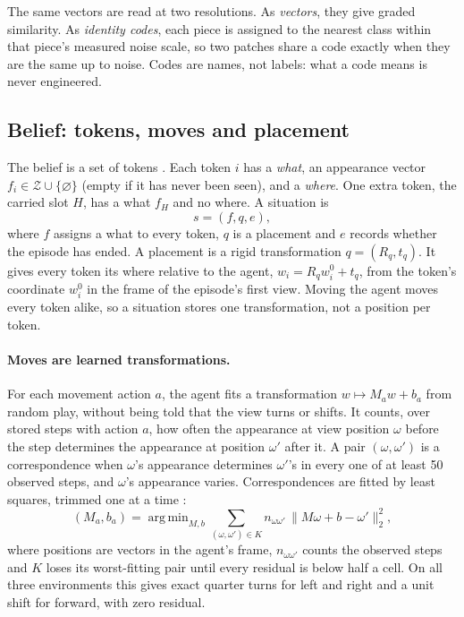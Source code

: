 \documentclass{article}
\DeclareMathOperator*{\argmin}{arg\,min}
\begin{document}
The same vectors are read at two resolutions. As \emph{vectors}, they give graded similarity. As \emph{identity codes}, each piece is assigned to the nearest class within that piece's measured noise scale, so two patches share a code exactly when they are the same up to noise. Codes are names, not labels: what a code means is never engineered.

\subsection{Belief: tokens, moves and placement}
\label{sec:belief}

The belief is a set of tokens \cite{Dosovitskiy2021,Locatello2020}. Each token $i$ has a \emph{what}, an appearance vector $f_i\in\mathcal{Z}\cup\{\varnothing\}$ (empty if it has never been seen), and a \emph{where}. One extra token, the carried slot $H$, has a what $f_H$ and no where. A situation is
\begin{equation} \label{eq:situation}
    s = (f, q, e),
\end{equation}
where $f$ assigns a what to every token, $q$ is a placement and $e$ records whether the episode has ended. A placement is a rigid transformation $q=(R_q, t_q)$. It gives every token its where relative to the agent, $w_i = R_q w_i^0 + t_q$, from the token's coordinate $w^0_i$ in the frame of the episode's first view. Moving the agent moves every token alike, so a situation stores one transformation, not a position per token.

\paragraph{Moves are learned transformations.} For each movement action $a$, the agent fits a transformation $w\mapsto M_a w+b_a$ from random play, without being told that the view turns or shifts. It counts, over stored steps with action $a$, how often the appearance at view position $\omega$ before the step determines the appearance at position $\omega'$ after it. A pair $(\omega,\omega')$ is a correspondence when $\omega$'s appearance determines $\omega'$'s in every one of at least 50 observed steps, and $\omega$'s appearance varies. Correspondences are fitted by least squares, trimmed one at a time \cite{Rousseeuw1984}:
\begin{equation} \label{eq:moves}
    (M_a, b_a) = \argmin_{M,b}\sum_{(\omega,\omega')\in K}n_{\omega\omega'}\,\big\|M \omega + b - \omega'\big\|_2^2,
\end{equation}
where positions are vectors in the agent's frame, $n_{\omega\omega'}$ counts the observed steps and $K$ loses its worst-fitting pair until every residual is below half a cell. On all three environments this gives exact quarter turns for left and right and a unit shift for forward, with zero residual.
\end{document}
